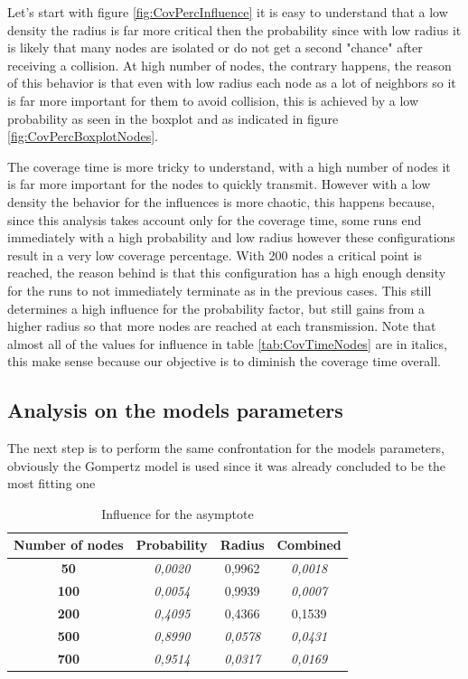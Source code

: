 Let's start with figure \ref{fig:CovPercInfluence} it is easy to understand that a low density the radius is far more critical then the probability since with low radius it is likely that many nodes are isolated or do not get a second "chance" after receiving a collision. At high number of nodes, the contrary happens, the reason of this behavior is that even with low radius each node as a lot of neighbors so it is far more important for them to avoid collision, this is achieved by a low probability as seen in the boxplot and as indicated in figure  \ref{fig:CovPercBoxplotNodes}.

The coverage time is more tricky to understand, with a high number of nodes it is far more important for the nodes to quickly transmit. However with a low density the behavior for the influences is more chaotic, this happens because, since this analysis takes account only for the coverage time, some runs end immediately with a high probability and low radius however these configurations result in a very low coverage percentage. With 200 nodes a critical point is reached, the reason behind is that this configuration has a high enough density for the runs to not immediately terminate as in the previous cases. This still determines a high influence for the probability factor, but still gains from a higher radius so that more nodes are reached at each transmission. Note that almost all of the values for influence in table \ref{tab:CovTimeNodes} are in italics, this make sense because our objective is to diminish the coverage time overall.

\iffalse
\subsection{Analysis on the models parameters}
The next step is to perform the same confrontation for the models parameters, obviously the Gompertz model is used since it was already concluded to be the most fitting one

\begin{table}[H]
\centering
\begin{tabular}{|c|c|c|c|}
\hline
\textbf{Number of   nodes} & \textbf{Probability} & \textbf{Radius} & \textbf{Combined} \\ \hline
\textbf{50} & \textit{0,0020} & 0,9962 & \textit{0,0018} \\ \hline
\textbf{100} & \textit{0,0054} & 0,9939 & \textit{0,0007} \\ \hline
\textbf{200} & \textit{0,4095} & 0,4366 & 0,1539 \\ \hline
\textbf{500} & \textit{0,8990} & \textit{0,0578} & \textit{0,0431} \\ \hline
\textbf{700} & \textit{0,9514} & \textit{0,0317} & \textit{0,0169} \\ \hline
\end{tabular}
\caption{Influence for the asymptote}
\end{table}


